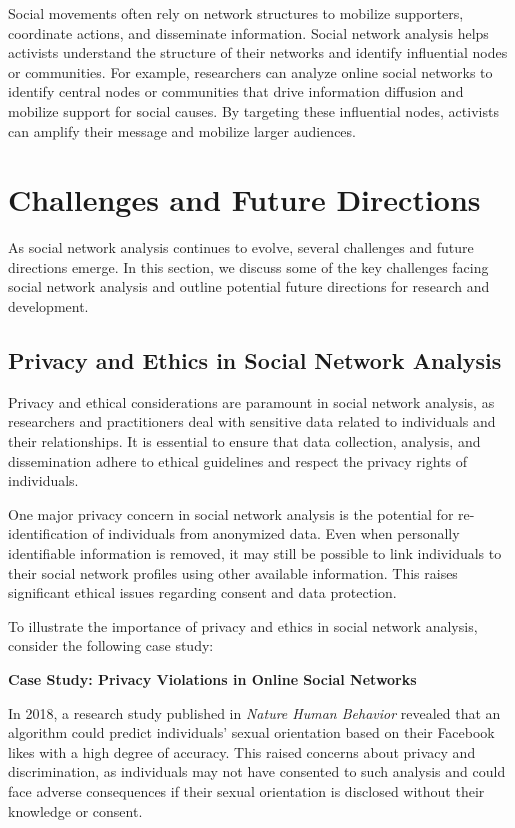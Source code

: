 \documentclass[12pt]{book} %
\begin{document}
Social movements often rely on network structures to mobilize supporters, coordinate actions, and disseminate information. Social network analysis helps activists understand the structure of their networks and identify influential nodes or communities. For example, researchers can analyze online social networks to identify central nodes or communities that drive information diffusion and mobilize support for social causes. By targeting these influential nodes, activists can amplify their message and mobilize larger audiences.


\section{Challenges and Future Directions}

As social network analysis continues to evolve, several challenges and future directions emerge. In this section, we discuss some of the key challenges facing social network analysis and outline potential future directions for research and development.

\subsection{Privacy and Ethics in Social Network Analysis}

Privacy and ethical considerations are paramount in social network analysis, as researchers and practitioners deal with sensitive data related to individuals and their relationships. It is essential to ensure that data collection, analysis, and dissemination adhere to ethical guidelines and respect the privacy rights of individuals.

One major privacy concern in social network analysis is the potential for re-identification of individuals from anonymized data. Even when personally identifiable information is removed, it may still be possible to link individuals to their social network profiles using other available information. This raises significant ethical issues regarding consent and data protection.

To illustrate the importance of privacy and ethics in social network analysis, consider the following case study:

\textbf{Case Study: Privacy Violations in Online Social Networks}

In 2018, a research study published in \textit{Nature Human Behavior} revealed that an algorithm could predict individuals' sexual orientation based on their Facebook likes with a high degree of accuracy. This raised concerns about privacy and discrimination, as individuals may not have consented to such analysis and could face adverse consequences if their sexual orientation is disclosed without their knowledge or consent.
\end{document}
